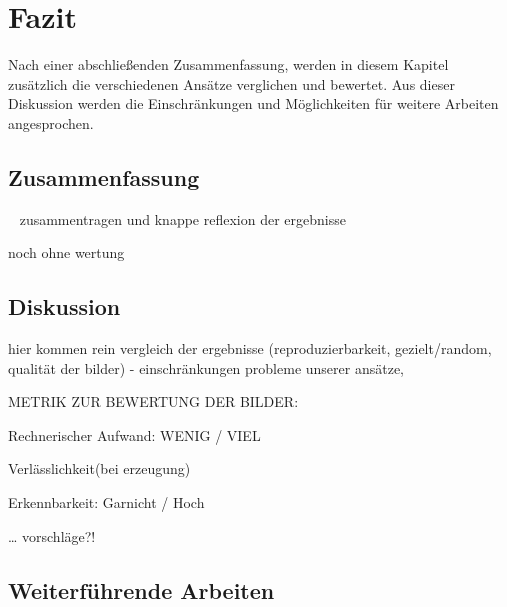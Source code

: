 \chapter{Fazit}
\label{cha:Fazit} \label{cha:Schluss}
Nach einer abschließenden Zusammenfassung, werden in diesem Kapitel zusätzlich die verschiedenen Ansätze verglichen und bewertet. Aus dieser Diskussion werden die Einschränkungen und Möglichkeiten für weitere Arbeiten angesprochen.

\section{Zusammenfassung} ~\newline 
zusammentragen und knappe reflexion der ergebnisse


noch ohne wertung




\section{Diskussion}


hier kommen rein
vergleich der ergebnisse (reproduzierbarkeit, gezielt/random, qualität der bilder)
- einschränkungen probleme unserer ansätze, 



METRIK ZUR BEWERTUNG DER BILDER:


Rechnerischer Aufwand: WENIG  /  VIEL


Verlässlichkeit(bei erzeugung) 


Erkennbarkeit: Garnicht / Hoch


… vorschläge?!



\section{Weiterführende Arbeiten}~\newline 